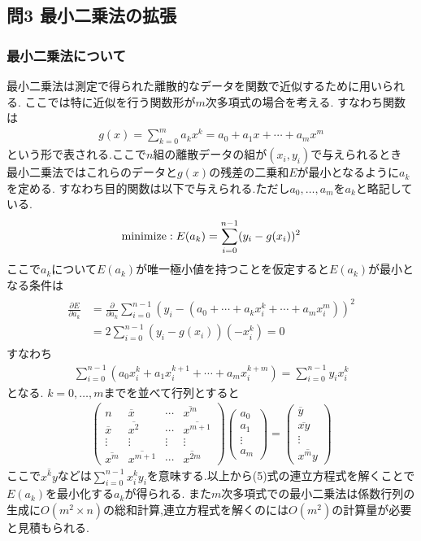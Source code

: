 \subsection*{問3 最小二乗法の拡張}
\subsubsection*{最小二乗法について}
最小二乗法は測定で得られた離散的なデータを関数で近似するために用いられる.
ここでは特に近似を行う関数形が$m$次多項式の場合を考える.
すなわち関数は
\begin{align}
  g(x)=\sum_{k=0}^{m} a_kx^k=a_0+a_1x+\cdots+a_mx^m
\end{align}
という形で表される.ここで$n$組の離散データの組が$(x_i,y_i)$で与えられるとき
最小二乗法ではこれらのデータと$g(x)$の残差の二乗和$E$が最小となるように$a_k$を定める.
すなわち目的関数は以下で与えられる.ただし$a_0,\ldots,a_m$を$a_k$と略記している.
\begin{align}
  {\rm minimize}: E(a_k)=\sum_{i=0}^{n-1}(y_i-g(x_i))^2
\end{align}
ここで$a_k$について$E(a_k)$が唯一極小値を持つことを仮定すると$E(a_k)$が最小となる条件は
\begin{align}
  \begin{split}
    \frac{\partial E}{\partial a_k}&=\frac{\partial}{\partial a_k}\sum_{i=0}^{n-1}(y_i-(a_0+\cdots+a_kx_i^k+\cdots+a_mx_i^m))^2\\
    &=2\sum_{i=0}^{n-1}(y_i-g(x_i))(-x_i^k)=0
  \end{split}
\end{align}
すなわち
\begin{align}
  \sum_{i=0}^{n-1}(a_0x_i^k+a_1x_i^{k+1}+\cdots+a_mx_i^{k+m})=\sum_{i=0}^{n-1}y_ix_i^k
\end{align}
となる.
$k=0,\ldots,m$までを並べて行列とすると
\begin{align}
  \left(
    \begin{array}{cccc}
      n&\overline{x}&\cdots&\overline{x^m}\\
      \overline{x}&\overline{x^2}&\cdots&\overline{x^{m+1}}\\
      \vdots&\vdots&\vdots&\vdots\\
      \overline{x^m}&\overline{x^{m+1}}&\cdots&\overline{x^{2m}}
    \end{array}
  \right)
  \left(
    \begin{array}{c}
      a_0\\a_1\\\vdots\\a_m      
    \end{array}
  \right)=\left(
    \begin{array}{c}
      \overline{y}\\\overline{xy}\\\vdots\\\overline{x^my}
    \end{array}
  \right)
\end{align}
ここで$\overline{x^ky}$などは$\sum_{i=0}^{n-1}x^k_iy_i$を意味する.以上から(5)式の連立方程式を解くことで$E(a_k)$を最小化する$a_k$が得られる.
また$m$次多項式での最小二乗法は係数行列の生成に$O(m^2\times n)$の総和計算,連立方程式を解くのには$O(m^2)$の計算量が必要と見積もられる.
